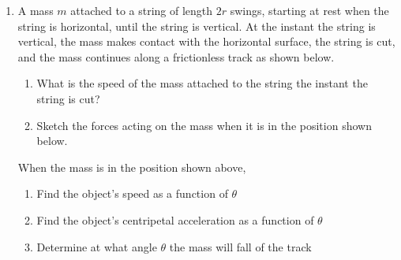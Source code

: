 \documentclass{../../../oss-apphys}
\begin{document}
\begin{enumerate}[leftmargin=15pt]
\item A mass $m$ attached to a string of length $2r$ swings, starting at rest
  when the string is horizontal, until the string is vertical. At the instant
  the string is vertical, the mass makes contact with the horizontal surface,
  the string is cut, and the mass continues along a frictionless track as shown
  below.
  \begin{center}
    \vspace{-.1in}
  \end{center}
  \begin{enumerate}[leftmargin=18pt]
  \item What is the speed of the mass attached to the string the instant the
    string is cut?
    \vspace{1in}
  \item Sketch the forces acting on the mass when it is in the position shown
    below.
    \begin{center}
    \end{center}
  \end{enumerate}
  When the mass is in the position shown above,
  \begin{enumerate}[leftmargin=18pt,resume]
  \item Find the object's speed as a function of $\theta$
    \vspace{.8in}
  \item Find the object's centripetal acceleration as a function of $\theta$
    \vspace{.8in}
  \item Determine at what angle $\theta$ the mass will fall of the track
  \end{enumerate}
  \newpage


\end{enumerate}
\end{document}
